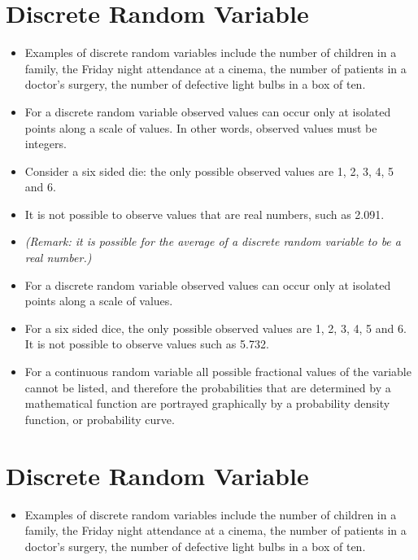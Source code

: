 \section*{Discrete Random Variable}
\begin{itemize}

\item Examples of discrete random variables include the number of children in a family, the Friday night attendance at a cinema, the number of patients in a doctor's surgery, the number of defective light bulbs in a box of ten.

\item For a discrete random variable observed values can occur only at isolated points along a scale of values. In other words, observed values must be integers.
\item Consider a six sided die: the only possible observed values are 1, 2, 3, 4, 5 and 6. 
\item It is not possible to observe values that are real numbers, such as 2.091.

\item \textit{(Remark: it is possible for the average of a discrete random variable to be a real number.)}

\item For a discrete random variable observed values can occur only at isolated points along a scale of values. \item For a six sided dice, the only possible observed values are 1, 2, 3, 4, 5 and 6. It is not possible to observe values such as 5.732.

\item For a continuous random variable all possible fractional values of the variable cannot be listed, and
therefore the probabilities that are determined by a mathematical function are portrayed graphically by a
probability density function, or probability curve.
\end{itemize}





\section{Discrete Random Variable}
\begin{itemize}

\item Examples of discrete random variables include the number of children in a family, the Friday night attendance at a cinema, the number of patients in a doctor's surgery, the number of defective light bulbs in a box of ten.
\end{itemize}

